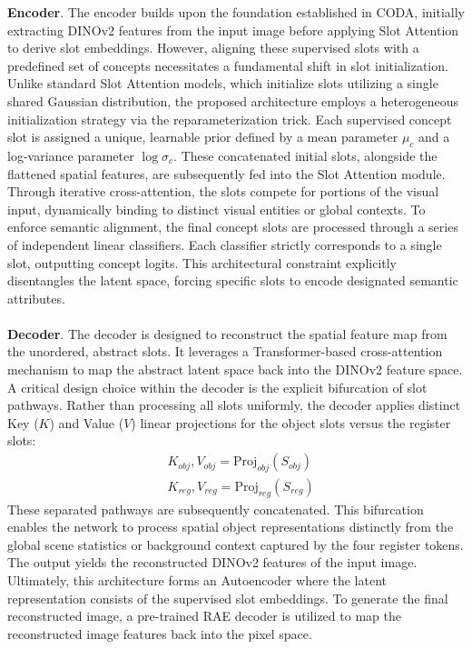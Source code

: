 \noindent
\textbf{Encoder}. The encoder builds upon the foundation established in CODA, initially extracting DINOv2 features from the input image before applying Slot Attention to derive slot embeddings. However, aligning these supervised slots with a predefined set of concepts necessitates a fundamental shift in slot initialization. Unlike standard Slot Attention models, which initialize slots utilizing a single shared Gaussian distribution, the proposed architecture employs a heterogeneous initialization strategy via the reparameterization trick. Each supervised concept slot is assigned a unique, learnable prior defined by a mean parameter $\mu_c$ and a log-variance parameter $\log\sigma_c$. These concatenated initial slots, alongside the flattened spatial features, are subsequently fed into the Slot Attention module. Through iterative cross-attention, the slots compete for portions of the visual input, dynamically binding to distinct visual entities or global contexts. To enforce semantic alignment, the final concept slots are processed through a series of independent linear classifiers. Each classifier strictly corresponds to a single slot, outputting concept logits. This architectural constraint explicitly disentangles the latent space, forcing specific slots to encode designated semantic attributes.  \\
\\
\textbf{Decoder}. The decoder is designed to reconstruct the spatial feature map from the unordered, abstract slots. It leverages a Transformer-based cross-attention mechanism to map the abstract latent space back into the DINOv2 feature space. A critical design choice within the decoder is the explicit bifurcation of slot pathways. Rather than processing all slots uniformly, the decoder applies distinct Key ($K$) and Value ($V$) linear projections for the object slots versus the register slots:
\begin{align}
    &K_{obj}, V_{obj} = \text{Proj}_{obj}(S_{obj}) \\
    &K_{reg}, V_{reg} = \text{Proj}_{reg}(S_{reg})
\end{align}
These separated pathways are subsequently concatenated. This bifurcation enables the network to process spatial object representations distinctly from the global scene statistics or background context captured by the four register tokens. The output yields the reconstructed DINOv2 features of the input image. Ultimately, this architecture forms an Autoencoder where the latent representation consists of the supervised slot embeddings. To generate the final reconstructed image, a pre-trained RAE decoder is utilized to map the reconstructed image features back into the pixel space. \\

